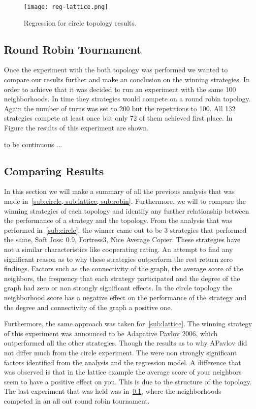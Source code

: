 \begin{figure}[h!]
\centering
    \texttt{[image: reg-lattice.png]}
    \caption{Regression for circle topology results.}
    \label{fig:lattice-regression}
\end{figure}
\newpage

\subsection{Round Robin Tournament}
\label{sub:robin}

Once the experiment with the both topology was performed we wanted to compare
our results further and make an conclusion on the winning strategies. In order
to achieve that it was decided to run an experiment with the same 100 neighborhoods.
In time they strategies would compete on a round robin topology. Again the
number of turns was set to 200 but the repetitions to 100. All 132 strategies
compete at least once but only 72 of them achieved first place. In Figure
the results of this experiment are shown.

to be continuous ...

\subsection{Comparing Results}

In this section we will make a summary of all the previous analysis that was made
in~\ref{sub:circle, sub:lattice, sub:robin}. Furthermore, we will to compare
the winning strategies of each topology and identify any further relationship
between the performance of a strategy and the topology. From the analysis that
was performed in~\ref{sub:circle}, the winner came out to be 3 strategies that
performed the same, Soft Joss: 0.9, Fortress3, Nice Average Copier.
These strategies have not a similar characteristics like cooperating rating.
An attempt to find any significant reason as to why these strategies outperform
the rest return zero findings. Factors such as the connectivity of the graph,
the average score of the neighbors, the frequency that each strategy participated
and the degree of the graph had zero or non strongly significant effects.
In the circle topology the neighborhood score has a negative effect on the performance
of the strategy and the degree and connectivity of the graph a positive one.

Furthermore, the same approach was taken for~\ref{sub:lattice}. The winning
strategy of this experiment was announced to be Adapative Pavlov 2006, which
outperformed all the other strategies. Though the results as to why APavlov
did not differ much from the circle experiment. The were non strongly significant
factors identified from the analysis and the regression model. A difference
that was observed is that in the lattice example the average score of your
neighbors seem to have a positive effect on you. This is due to the structure of
the topology. The last experiment that was held was in~\ref{sub:robin}, where
the neighborhoods competed in an all out round robin tournament.

